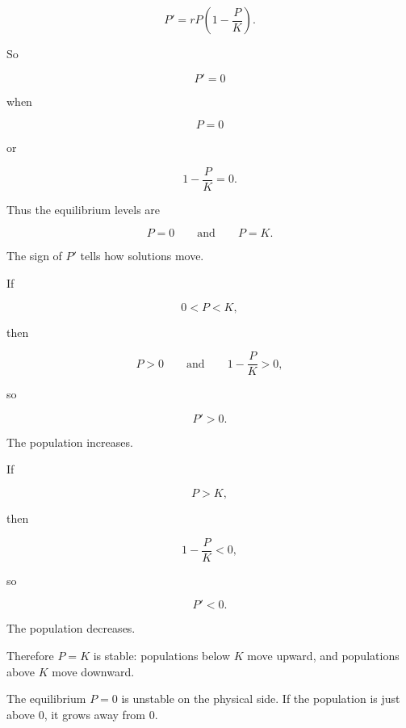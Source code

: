 \[
P'=rP\left(1-\frac{P}{K}\right).
\]

So

\[
P'=0
\]

when

\[
P=0
\]

or

\[
1-\frac{P}{K}=0.
\]

Thus the equilibrium levels are

\[
\boxed{
P=0
\qquad\text{and}\qquad
P=K.
}
\]

The sign of \(P'\) tells how solutions move.

If

\[
0<P<K,
\]

then

\[
P>0
\qquad\text{and}\qquad
1-\frac{P}{K}>0,
\]

so

\[
P'>0.
\]

The population increases.

If

\[
P>K,
\]

then

\[
1-\frac{P}{K}<0,
\]

so

\[
P'<0.
\]

The population decreases.

Therefore \(P=K\) is stable: populations below \(K\) move upward, and populations
above \(K\) move downward.

The equilibrium \(P=0\) is unstable on the physical side.  If the population is just
above \(0\), it grows away from \(0\).

